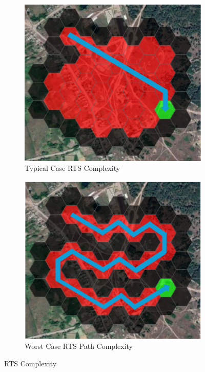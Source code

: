 \begin{figure}[htbp]\label{fig:rts_complexity}
  \centering
  \begin{subfigure}[b]{0.48\textwidth}
    \includegraphics[width=\textwidth]{figs/Thomas/Return To Safety/typical_case_complexity.png}
    \caption{Typical Case RTS Complexity}
    \label{fig:typical_case}
  \end{subfigure}
  \hfill
  \begin{subfigure}[b]{0.48\textwidth}
    \includegraphics[width=\textwidth]{figs/Thomas/Return To Safety/worst_case_complexity.png}
    \caption{Worst Case RTS Path Complexity}
    \label{fig:worst_case}
\end{subfigure}
\caption{RTS Complexity}
\end{figure}